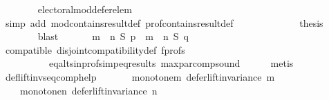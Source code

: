 \begin{isabellebody}
\ \ \ \ \ \ \isamarkupfalse%
\ electoral{\isacharunderscore}{\kern0pt}mod{\isacharunderscore}{\kern0pt}defer{\isacharunderscore}{\kern0pt}elem\isanewline
\ \ \ \ \ \ \isamarkupfalse%
\ {\isacharparenleft}{\kern0pt}simp\ add{\isacharcolon}{\kern0pt}\ mod{\isacharunderscore}{\kern0pt}contains{\isacharunderscore}{\kern0pt}result{\isacharunderscore}{\kern0pt}def\ prof{\isacharunderscore}{\kern0pt}contains{\isacharunderscore}{\kern0pt}result{\isacharunderscore}{\kern0pt}def{\isacharparenright}{\kern0pt}\isanewline
\ \ \ \ \isamarkupfalse%
\ {}{}\ {}{}\isanewline
\ \ \ \ \isamarkupfalse%
\ {\isacharquery}{\kern0pt}thesis\isanewline
\ \ \ \ \ \ \isamarkupfalse%
\ blast\isanewline
\ \ \isamarkupfalse%
\isanewline
\ \ \isamarkupfalse%
\ {\isachardoublequoteopen}{\isacharparenleft}{\kern0pt}m\ {\isasymparallel}\isactrlsub {\isasymup}\ n{\isacharparenright}{\kern0pt}\ S\ p\ {\isacharequal}{\kern0pt}\ {\isacharparenleft}{\kern0pt}m\ {\isasymparallel}\isactrlsub {\isasymup}\ n{\isacharparenright}{\kern0pt}\ S\ q{\isachardoublequoteclose}\isanewline
\ \ \ \ \isamarkupfalse%
\ compatible\ disjoint{\isacharunderscore}{\kern0pt}compatibility{\isacharunderscore}{\kern0pt}def\ f{\isacharunderscore}{\kern0pt}profs\isanewline
\ \ \ \ \ \ \ \ \ \ eq{\isacharunderscore}{\kern0pt}alts{\isacharunderscore}{\kern0pt}in{\isacharunderscore}{\kern0pt}profs{\isacharunderscore}{\kern0pt}imp{\isacharunderscore}{\kern0pt}eq{\isacharunderscore}{\kern0pt}results\ max{\isacharunderscore}{\kern0pt}par{\isacharunderscore}{\kern0pt}comp{\isacharunderscore}{\kern0pt}sound\isanewline
\ \ \ \ \isamarkupfalse%
\ metis\isanewline
{}\isamarkupfalse%
%
\endisatagproof
{\isafoldproof}%
%
\isadelimproof
\isanewline
%
\endisadelimproof
\isanewline
{}\isamarkupfalse%
\ def{\isacharunderscore}{\kern0pt}lift{\isacharunderscore}{\kern0pt}inv{\isacharunderscore}{\kern0pt}seq{\isacharunderscore}{\kern0pt}comp{\isacharunderscore}{\kern0pt}help{\isacharcolon}{\kern0pt}\isanewline
\ \ \isanewline
\ \ \ \ monotone{\isacharunderscore}{\kern0pt}m{\isacharcolon}{\kern0pt}\ {\isachardoublequoteopen}defer{\isacharunderscore}{\kern0pt}lift{\isacharunderscore}{\kern0pt}invariance\ m{\isachardoublequoteclose}\ \isanewline
\ \ \ \ monotone{\isacharunderscore}{\kern0pt}n{\isacharcolon}{\kern0pt}\ {\isachardoublequoteopen}defer{\isacharunderscore}{\kern0pt}lift{\isacharunderscore}{\kern0pt}invariance\ n{\isachardoublequoteclose}\ \isanewline

\end{isabellebody}

